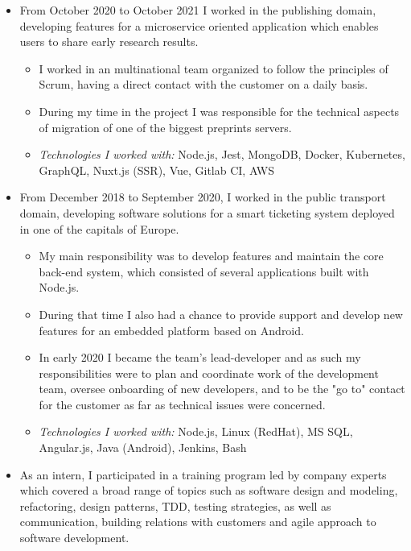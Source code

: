 \documentclass[10pt,a4paper,ragged2e]{altacv}
\begin{document}
\begin{itemize}
    \item From October 2020 to October 2021 I worked in the publishing domain, developing features for
    a microservice oriented application which enables users to share early research results.
    \begin{itemize}
        \item I worked in an multinational team organized to follow the principles of Scrum,
        having a direct contact with the customer on a daily basis.
        \item During my time in the project I was responsible for the technical aspects of migration of one of the biggest preprints servers.
        \item \textit{Technologies I worked with:} Node.js, Jest, MongoDB, Docker, Kubernetes, GraphQL, Nuxt.js (SSR),
        Vue, Gitlab CI, AWS
    \end{itemize}
 \divider
    \item From December 2018 to September 2020, I worked in the public transport domain,
    developing software solutions for a smart ticketing system deployed in one of the capitals of Europe.
    \begin{itemize}
        \item My main responsibility was to develop features and maintain the core back-end system,
        which consisted of several applications built with Node.js.
        \item During that time I also had a chance to provide support and develop new features
        for an embedded platform based on Android.
        \item In early 2020 I became the team’s lead-developer and as such my responsibilities
        were to plan and coordinate work of the development team, oversee onboarding of new
        developers, and to be the "go to" contact for the customer as far as technical
        issues were concerned.
        \item \textit{Technologies I worked with:} Node.js, Linux (RedHat), MS SQL, Angular.js,
        Java (Android), Jenkins, Bash
    \end{itemize}
\end{itemize}

\divider

\begin{itemize}
    \item As an intern, I participated in a training program led by company experts
    which covered a broad range of topics such as software design and modeling,
    refactoring, design patterns, TDD, testing strategies, as well as communication,
    building relations with customers and agile approach to software development.
\end{itemize}
\end{document}
